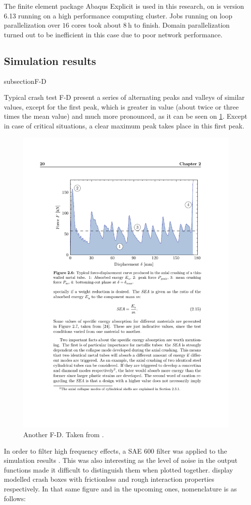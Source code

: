 \documentclass[cmfonts]{witpress}
\begin{document}
The finite element package Abaqus Explicit is used in this research, on is version 6.13 \cite{Abaqus613Manual} running on a high performance computing cluster. Jobs running on loop parallelization over $16$ cores took about $\SI{8}{\hour}$ to finish. Domain parallelization turned out to be inefficient in this case due to poor network performance.

\subsection{Simulation results}
subsection{F-D}
\label{sec:F-D}

Typical crash test F-D present a series of alternating peaks and valleys of similar values, except for the first peak, which is greater in value (about twice or three times the mean value) and much more pronounced, as it can be seen on \cref{fig:phdcostas_f-d}. Except in case of critical situations, a clear maximum peak takes place in this first peak.

\begin{figure}
\centering
\includegraphics[width=0.7\linewidth]{figures/IMG_CUTRES/phdcostas_f-d}
\caption[Another F-D.]{Another F-D. Taken from \cite{phdCostas}.}
\label{fig:phdcostas_f-d}
\end{figure}

In order to filter high frequency effects, a SAE 600 filter was applied to the simulation results \cite{Huang}. This was also interesting as the level of noise in the output functions made it difficult to distinguish them when plotted together.  display modelled crash boxes with frictionless and rough interaction properties respectively. In that same figure and in the upcoming ones, nomenclature is as follows:
\end{document}
